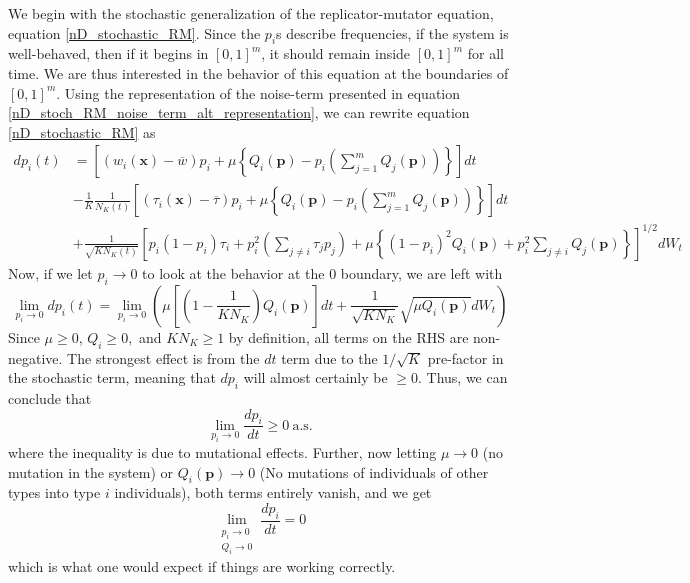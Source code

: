 We begin with the stochastic generalization of the replicator-mutator equation, equation \eqref{nD_stochastic_RM}. Since the $p_i$s describe frequencies, if the system is well-behaved, then if it begins in $[0,1]^{m}$, it should remain inside $[0,1]^{m}$ for all time. We are thus interested in the behavior of this equation at the boundaries of $[0,1]^{m}$. Using the representation of the noise-term presented in equation \eqref{nD_stoch_RM_noise_term_alt_representation}, we can rewrite equation \eqref{nD_stochastic_RM} as
\begin{equation}
	\label{App_well_behavedness_stoch_RM}
	\begin{aligned}
		dp_i(t) &= \left[(w_i(\mathbf{x}) - \overline{w})p_i + \mu\left\{Q_i(\mathbf{p}) - p_i\left(\sum\limits_{j=1}^{m}Q_j(\mathbf{p})\right)\right\}\right]dt\\[15pt]
		&- \frac{1}{K}\frac{1}{N_{K}(t)}\left[(\tau_i(\mathbf{x}) - \overline{\tau})p_i + \mu\left\{Q_i(\mathbf{p}) - p_i\left(\sum\limits_{j=1}^{m}Q_j(\mathbf{p})\right)\right\}\right]dt\\[15pt]
		&+ \frac{1}{\sqrt{KN_{K}(t)}}\left[p_i(1-p_i)\tau_i + p_i^2\left(\sum\limits_{j\neq i}\tau_j p_j\right) + \mu\left\{(1-p_i)^2Q_i(\mathbf{p}) + p_i^2 \sum\limits_{j\neq i}Q_j(\mathbf{p})\right\}\right]^{1/2}dW_t
	\end{aligned}
\end{equation}
Now, if we let $p_i \to 0$ to look at the behavior at the $0$ boundary, we are left with
\begin{equation*}
	\lim\limits_{p_i \to 0} dp_i(t) = \lim\limits_{p_i \to 0}\left( \mu\left[\left(1-\frac{1}{KN_K}\right)Q_i(\mathbf{p})\right]dt+ \frac{1}{\sqrt{KN_{K}}}\sqrt{\mu Q_i(\mathbf{p})}dW_t\right)
\end{equation*}
Since $\mu \geq 0$, $Q_i \geq 0,$ and $KN_K \geq 1$ by definition, all terms on the RHS are non-negative. The strongest effect is from the $dt$ term due to the $1/\sqrt{K}$ pre-factor in the stochastic term, meaning that $dp_i$ will almost certainly be $\geq 0$. Thus, we can conclude that
\begin{equation*}
	\lim\limits_{p_i \to 0} \frac{dp_i}{dt} \geq 0 \ \textrm{a.s.}
\end{equation*}
where the inequality is due to mutational effects. Further, now letting $\mu \to 0$ (no mutation in the system) or $Q_i(\mathbf{p}) \to 0$ (No mutations of individuals of other types into type $i$ individuals), both terms entirely vanish, and we get
\begin{equation*}
	\lim_{\substack{p_i \to 0 \\ Q_i \to 0}} \frac{dp_i}{dt} = 0
\end{equation*}
which is what one would expect if things are working correctly.

